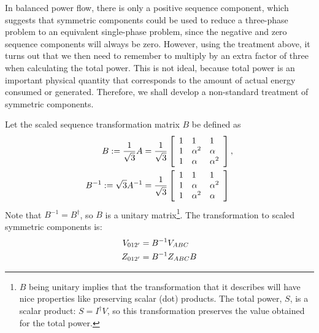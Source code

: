 \documentclass[10pt]{article}
\begin{document}
In balanced power flow, there is only a positive sequence component, which suggests that symmetric components could be used to reduce a three-phase problem to an equivalent single-phase problem, since the negative and zero sequence components will always be zero. However, using the treatment above, it turns out that we then need to remember to multiply by an extra factor of three when calculating the total power. This is not ideal, because total power is an important physical quantity that corresponds to the amount of actual energy consumed or generated. Therefore, we shall develop a non-standard treatment of symmetric components.

Let the scaled sequence transformation matrix $B$ be defined as
\begin{align}
	B := \frac{1}{\sqrt{3}}A &= \frac{1}{\sqrt{3}}\left[
		\begin{array}{lll}
			1 & 1 & 1 \\
			1 & \alpha^2 & \alpha \\
			1 & \alpha & \alpha^2
		\end{array}	\right], \notag \\
	B^{-1} := \sqrt{3} A^{-1} &=\frac{1}{\sqrt{3}}\left[
		\begin{array}{lll}
			1 & 1 & 1 \\
			1 & \alpha & \alpha^2 \\
			1 & \alpha^2 & \alpha
		\end{array} \right]
\end{align}
Note that $B^{-1} = B^\dag$, so $B$ is a unitary matrix\footnote{$B$ being unitary implies that the transformation that it describes will have nice properties like preserving scalar (dot) products. The total power, $S$, is a scalar product: $S = I^\dag V$, so this transformation preserves the value obtained for the total power.}. The transformation to scaled symmetric components is:
\begin{align}
	V_{012'} &= B^{-1}V_{ABC} \notag \\
	Z_{012'} &= B^{-1}Z_{ABC}B
\end{align}
\end{document}
